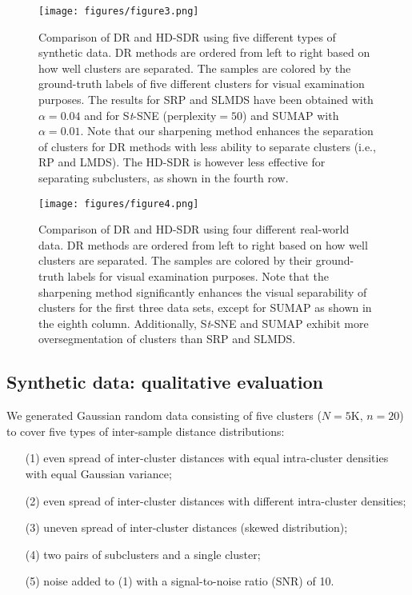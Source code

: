 \documentclass[sagev,Afour,times]{sagej}
\begin{document}
\begin{sidewaysfigure*}
  \texttt{[image: figures/figure3.png]}
  \caption{\label{fig:3fdr_all_synthetic} Comparison of DR and HD-SDR using five different types of synthetic data. DR methods are ordered from left to right based on how well clusters are separated. The samples are colored by the ground-truth labels of five different clusters for visual examination purposes. The results for SRP and SLMDS have been obtained with $\alpha=0.04$ and for S\emph{t}-SNE (perplexity$=50$) and SUMAP with $\alpha=0.01$. Note that our sharpening method enhances the separation of clusters for DR methods with less ability to separate clusters (i.e., RP and LMDS). The HD-SDR is however less effective for separating subclusters, as shown in the fourth row.
  }
\end{sidewaysfigure*}

\begin{sidewaysfigure*}
  \centering
  \texttt{[image: figures/figure4.png]}
  \caption{\label{fig:4fdr_all_realworld} Comparison of DR and HD-SDR using four different real-world data. DR methods are ordered from left to right based on how well clusters are separated. The samples are colored by their ground-truth labels for visual examination purposes. Note that the sharpening method significantly enhances the visual separability of clusters for the first three data sets, except for SUMAP as shown in the eighth column. Additionally, S\emph{t}-SNE and SUMAP exhibit more oversegmentation of clusters than SRP and SLMDS.
  }
\end{sidewaysfigure*}

\subsection{Synthetic data: qualitative evaluation}
\label{sec:results:synthetic}
We generated Gaussian random data consisting of five clusters ($N=5\mathrm{K}$, $n=20$) to cover five types of inter-sample distance distributions:
\begin{itemize}
    \item[(1)] even spread of inter-cluster distances with equal intra-cluster densities with equal Gaussian variance;
    \item[(2)] even spread of inter-cluster distances with different intra-cluster densities;
    \item[(3)] uneven spread of inter-cluster distances (skewed distribution);
    \item[(4)] two pairs of subclusters and a single cluster;
    \item[(5)] noise added to (1) with a signal-to-noise ratio (SNR) of 10.
\end{itemize}
\end{document}

